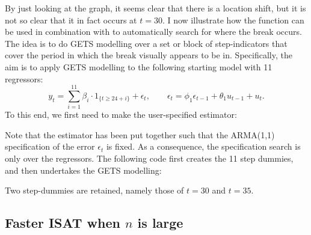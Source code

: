 %
By just looking at the graph, it seems clear that there is a location shift, but it is not so clear that it in fact occurs at $t=30$. I now illustrate how the  function can be used in combination with  to automatically search for where the break occurs. The idea is to do GETS modelling over a set or block of step-indicators that cover the period in which the break visually appears to be in. Specifically, the aim is to apply GETS modelling to the following starting model with 11 regressors:
%
\begin{equation*}
	y_t = \sum_{i=1}^{11} \beta_i \cdot 1_{ \{ t \geq 24+i \} } + \epsilon_t, \qquad \epsilon_t = \phi_1 \epsilon_{t-1} + \theta_1 u_{t-1} + u_t.
\end{equation*} 
%
To this end, we first need to make the user-specified estimator:
%
%
Note that the estimator has been put together such that the ARMA(1,1) specification of the error $\epsilon_t$ is fixed. As a consequence, the specification search is only over the regressors. The following code first creates the 11 step dummies, and then undertakes the GETS modelling:
%
%
Two step-dummies are retained, namely those of $t=30$ and $t=35$.

\subsection{Faster ISAT when $n$ is large}


